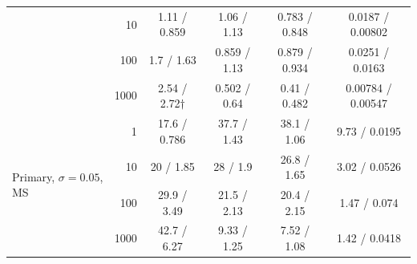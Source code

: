 \begin{table}[t]
\begin{tabular}{lrcccc}
 & 10 & 1.11 / 0.859 & 1.06 / 1.13 & 0.783 / 0.848 & 0.0187 / 0.00802 \\
 & 100 & 1.7 / 1.63 & 0.859 / 1.13 & 0.879 / 0.934 & 0.0251 / 0.0163 \\
 & 1000 & 2.54 / 2.72$\dagger$ & 0.502 / 0.64 & 0.41 / 0.482 & 0.00784 / 0.00547 \\
\midrule\multirow{4}{*}{Primary, $\sigma=0.05$, MS} & 1 & 17.6 / 0.786 & 37.7 / 1.43 & 38.1 / 1.06 & 9.73 / 0.0195 \\
 & 10 & 20 / 1.85 & 28 / 1.9 & 26.8 / 1.65 & 3.02 / 0.0526 \\
 & 100 & 29.9 / 3.49 & 21.5 / 2.13 & 20.4 / 2.15 & 1.47 / 0.074 \\
 & 1000 & 42.7 / 6.27 & 9.33 / 1.25 & 7.52 / 1.08 & 1.42 / 0.0418 \\
\bottomrule
\end{tabular}
\end{table}
